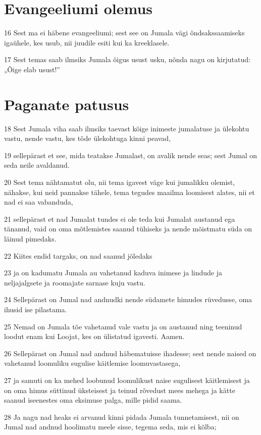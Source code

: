 \section*{Evangeeliumi olemus}

\par 16 Sest ma ei häbene evangeeliumi; sest see on Jumala vägi õndsakssaamiseks igaühele, kes usub, nii juudile esiti kui ka kreeklasele.
\par 17 Sest temas saab ilmsiks Jumala õigus usust usku, nõnda nagu on kirjutatud: „Õige elab usust!”

\section*{Paganate patusus}

\par 18 Sest Jumala viha saab ilmsiks taevast kõige inimeste jumalatuse ja ülekohtu vastu, nende vastu, kes tõde ülekohtuga kinni peavad,
\par 19 sellepärast et see, mida teatakse Jumalast, on avalik nende seas; sest Jumal on seda neile avaldanud.
\par 20 Sest tema nähtamatut olu, nii tema igavest väge kui jumalikku olemist, nähakse, kui neid pannakse tähele, tema tegudes maailma loomisest alates, nii et nad ei saa vabanduda,
\par 21 sellepärast et nad Jumalat tundes ei ole teda kui Jumalat austanud ega tänanud, vaid on oma mõtlemistes saanud tühiseks ja nende mõistmatu süda on läinud pimedaks.
\par 22 Kiites endid targaks, on nad saanud jõledaks
\par 23 ja on kadumatu Jumala au vahetanud kaduva inimese ja lindude ja neljajalgsete ja roomajate sarnase kuju vastu.
\par 24 Sellepärast on Jumal nad andnudki nende südamete himudes rüvedusse, oma ihusid ise pilastama.
\par 25 Nemad on Jumala tõe vahetanud vale vastu ja on austanud ning teeninud loodut enam kui Loojat, kes on ülistatud igavesti. Aamen.
\par 26 Sellepärast on Jumal nad andnud häbematuisse ihadesse; sest nende naised on vahetanud loomuliku sugulise käitlemise loomuvastasega,
\par 27 ja samuti on ka mehed loobunud loomulikust naise sugulisest käitlemisest ja on oma himus süttinud üksteisest ja teinud rõvedust mees mehega ja kätte saanud iseenestes oma eksimuse palga, mille pidid saama.
\par 28 Ja nagu nad heaks ei arvanud kinni pidada Jumala tunnetamisest, nii on Jumal nad andnud hoolimatu meele sisse, tegema seda, mis ei kõlba;
